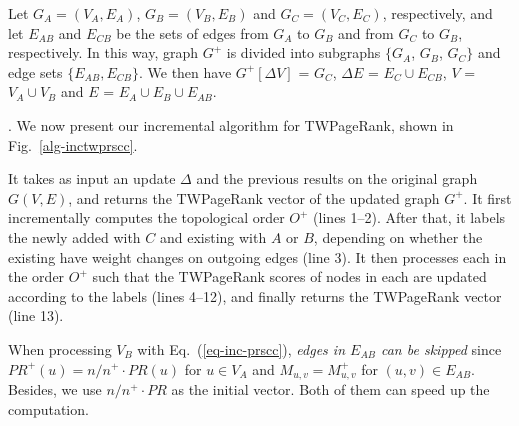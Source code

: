 Let $G_A=(V_A,E_A)$, $G_B=(V_B,E_B)$ and $G_C=(V_C,E_C)$, respectively, and
let $E_{AB}$ and $E_{CB}$  be the sets of edges from $G_A$ to $G_B$ and from $G_C$ to $G_B$, respectively.
In this way, graph $G^+$ is divided into subgraphs $\{G_A$, $G_B$, $G_C\}$ and edge sets $\{E_{AB}, E_{CB}\}$.
%
We then have $G^+[\Delta V]$ = $G_C$, $\Delta E$ = $E_C\cup E_{CB}$, $V$ = $V_A\cup V_B$ and $E$ = $E_A\cup E_B\cup E_{AB}$.



. We now present our incremental algorithm for TWPageRank, shown in Fig.~\ref{alg-inctwprscc}.


It takes as input an update $\Delta$ and the previous results on the original graph $G(V, E)$, and returns the TWPageRank vector of the updated graph $G^+$. It first incrementally computes the topological order $O^+$
(lines 1--2). %
%
After that, it labels the newly added \sccs with $C$ and existing \sccs with $A$ or $B$, depending on whether the existing \sccs have weight changes on outgoing edges (line 3).
%
It then processes each \scc in the order $O^+$ such that the TWPageRank scores of nodes in each \scc are updated according to the labels (lines 4--12), and finally returns the TWPageRank vector (line 13).
%
%

When processing $V_B$ with Eq.~(\ref{eq-inc-prscc}), {\em edges in $E_{AB}$ can be skipped}  since $PR^+(u)={n}/{n^+}\cdot PR(u)$ for $u\in V_A$ and $M_{u,v}=M^+_{u,v}$ for $(u,v)\in E_{AB}$. Besides, we use ${n}/{n^+}\cdot PR$ as the initial vector. Both of them can speed up the computation.


